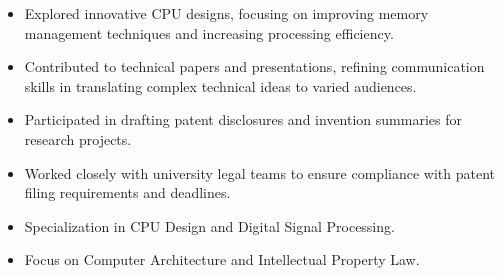\par\smallskip
\noindent
\begin{minipage}{20cm}
  \begin{minipage}{9.75cm}
    \begin{itemize}
      \item Explored innovative CPU designs, focusing on improving memory management techniques and increasing processing efficiency.
      \item Contributed to technical papers and presentations, refining communication skills in translating complex technical ideas to varied audiences.
    \end{itemize}
  \end{minipage}
  \hfill
  \begin{minipage}{9.75cm}
    \begin{itemize}
      \item Participated in drafting patent disclosures and invention summaries for research projects.
      \item Worked closely with university legal teams to ensure compliance with patent filing requirements and deadlines.
    \end{itemize}
  \end{minipage}
\end{minipage}

\begin{itemize}
  \item Specialization in CPU Design and Digital Signal Processing.
\end{itemize}

\begin{itemize}
  \item Focus on Computer Architecture and Intellectual Property Law.
\end{itemize}

\noindent
\begin{minipage}{20cm}
\end{minipage}


